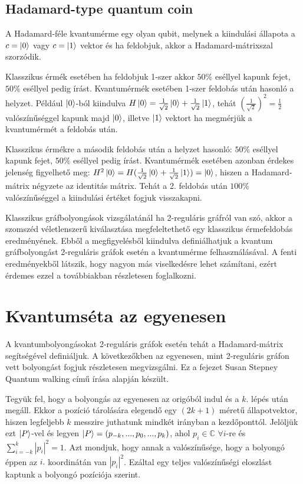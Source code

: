 \section{Hadamard-type quantum coin}

A Hadamard-féle kvantumérme egy olyan qubit, melynek a kiindulási állapota a $c
  = \ket{0}$ vagy $c = \ket{1}$ vektor és ha feldobjuk, akkor a
Hadamard-mátrixszal szorzódik.

Klasszikus érmék esetében ha feldobjuk 1-szer akkor $50\%$ eséllyel kapunk
fejet, $50\%$ eséllyel pedig írást. Kvantumérmék esetében 1-szer feldobás után
hasonló a helyzet. Például $\ket{0}$-ból kiindulva $H\ket{0} =
  \frac{1}{\sqrt{2}}\ket{0} + \frac{1}{\sqrt{2}}\ket{1}$, tehát
$(\frac{1}{\sqrt{2}})^2 = \frac{1}{2}$ valószínűséggel kapunk majd $\ket{0}$,
illetve $\ket{1}$ vektort ha megmérjük a kvantumérmét a feldobás után.

Klasszikus érmékre a második feldobás után a helyzet hasonló: $50\%$ eséllyel
kapunk fejet, $50\%$ eséllyel pedig írást. Kvantumérmék esetében azonban
érdekes jelenség figyelhető meg: $H^2\ket{0} = H(\frac{1}{\sqrt{2}}\ket{0} +
  \frac{1}{\sqrt{2}}\ket{1}) = \ket{0}$, hiszen a Hadamard-mátrix négyzete az
identitás mátrix. Tehát a 2. feldobás után $100\%$ valószínűséggel a kiindulási
értéket fogjuk visszakapni.

Klasszikus gráfbolyongások vizsgálatánál ha 2-reguláris gráfról van szó, akkor
a szomszéd véletlenszerű kiválasztása megfeleltethető egy klasszikus
érmefeldobás eredményének. Ebből a megfigyelésből kiindulva definiálhatjuk a
kvantum gráfbolyongást 2-reguláris gráfok esetén a kvantumérme
felhasználásával. A fenti eredményekből látszik, hogy nagyon más viselkedésre
lehet számítani, ezért érdemes ezzel a továbbiakban részletesen foglalkozni.

\chapter{Kvantumséta az egyenesen}

A kvantumbolyongásokat 2-reguláris gráfok esetén tehát a Hadamard-mátrix
segítségével definiáljuk. A következőkben az egyenesen, mint 2-reguláris gráfon
vett bolyongást fogjuk részletesen megvizsgálni. Ez a fejezet Susan Stepney
Quantum walking című írása \cite{Stepney} alapján készült.

Tegyük fel, hogy a bolyongás az egyenesen az origóból indul és a $k.$ lépés
után megáll. Ekkor a pozíció tárolására elegendő egy $(2k+1)$ méretű
állapotvektor, hiszen legfeljebb $k$ messzire juthatunk mindkét irányban a
kezdőponttól. Jelöljük ezt $\ket{P}$-vel és legyen $\ket{P}=(p_{-k}, ..., p_0,
  ..., p_{k})$, ahol $p_i\in\mathds{C}$ $\forall i$-re és $\sum\limits_{i=-k}^{k}
  |p_i|^2 = 1$. Azt mondjuk, hogy annak a valószínűsége, hogy a bolyongó éppen az
$i.$ koordinátán van $|p_i|^2$. Ezáltal egy teljes valószínűségi eloszlást
kaptunk a bolyongó pozíciója szerint.

